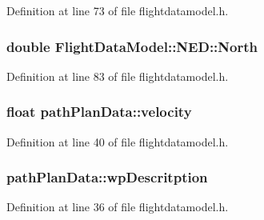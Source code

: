 \-Definition at line 73 of file flightdatamodel.\-h.

\hypertarget{group___path_ga67abe9626bfdec594f13dadb6a8e0507}{
\subsubsection[{\-North}]{\setlength{\rightskip}{0pt plus 5cm}double \-Flight\-Data\-Model\-::\-N\-E\-D\-::\-North}}\label{group___path_ga67abe9626bfdec594f13dadb6a8e0507}


\-Definition at line 83 of file flightdatamodel.\-h.

\hypertarget{group___path_ga58910b1bf08e8e02291db4ea420cc383}{
\subsubsection[{velocity}]{\setlength{\rightskip}{0pt plus 5cm}float {\bf path\-Plan\-Data\-::velocity}}}\label{group___path_ga58910b1bf08e8e02291db4ea420cc383}


\-Definition at line 40 of file flightdatamodel.\-h.

\hypertarget{group___path_gac7fc0b526eac540aa404e9d3d6ee95ef}{
\subsubsection[{wp\-Descritption}]{ {\bf path\-Plan\-Data\-::wp\-Descritption}}}\label{group___path_gac7fc0b526eac540aa404e9d3d6ee95ef}


\-Definition at line 36 of file flightdatamodel.\-h.

